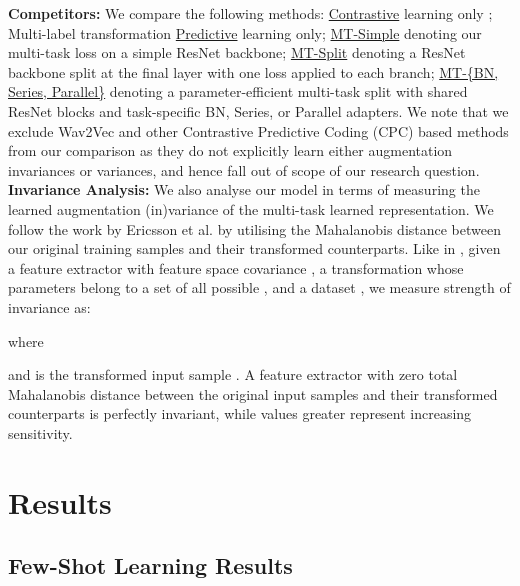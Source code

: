 \documentclass{INTERSPEECH2023}
\begin{document}
\newline\noindent\textbf{Competitors:} We compare the following methods: \underline{Contrastive} learning only \cite{simclr,simsiam}; Multi-label transformation \underline{Predictive} learning only; \underline{MT-Simple} denoting our multi-task loss on a simple ResNet backbone; \underline{MT-Split} denoting a ResNet backbone split at the final layer with one loss applied to each branch; \underline{MT-\{BN, Series, Parallel\}} denoting a parameter-efficient multi-task split with shared ResNet blocks and task-specific BN, Series, or Parallel adapters. We note that we exclude Wav2Vec \cite{wav2vec2} and other Contrastive Predictive Coding (CPC) based methods from our comparison as they do not explicitly learn either augmentation invariances or variances, and hence fall out of scope of our research question.
\newline\noindent\textbf{Invariance Analysis:} We also analyse our model in terms of measuring the learned augmentation (in)variance of the multi-task learned representation.  We follow the work by Ericsson et al. \cite{linus_invariance} by utilising the Mahalanobis distance between our original training samples and their transformed counterparts. Like in \cite{linus_invariance}, given a feature extractor  with feature space covariance , a transformation  whose parameters belong to a set of all possible , and a dataset , we measure strength of invariance as:


where 

and  is the transformed input sample . A feature extractor with zero total Mahalanobis distance between the original input samples and their transformed counterparts is perfectly invariant, while values greater represent increasing sensitivity.


\section{Results}
\subsection{Few-Shot Learning Results}
\end{document}
